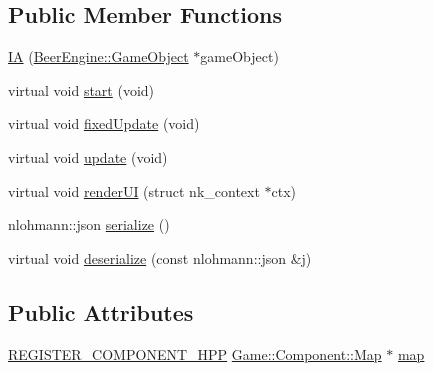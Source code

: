 \subsection*{Public Member Functions}
\begin{DoxyCompactItemize}
\item 
\mbox{\hyperlink{class_game_1_1_component_1_1_i_a_a0193b2ba07bc5bcabe9278a6dcd592bc}{IA}} (\mbox{\hyperlink{class_beer_engine_1_1_game_object}{Beer\+Engine\+::\+Game\+Object}} $\ast$game\+Object)
\item 
virtual void \mbox{\hyperlink{class_game_1_1_component_1_1_i_a_ab440dc76a8837e291f6545e0dd15c819}{start}} (void)
\item 
virtual void \mbox{\hyperlink{class_game_1_1_component_1_1_i_a_a72b1e3aaf4686e0abef2e147d48f50e9}{fixed\+Update}} (void)
\item 
virtual void \mbox{\hyperlink{class_game_1_1_component_1_1_i_a_a5890e0da2fb55d58868c0cd441c33dc4}{update}} (void)
\item 
virtual void \mbox{\hyperlink{class_game_1_1_component_1_1_i_a_a50991daa660054341c1f339611226c02}{render\+UI}} (struct nk\+\_\+context $\ast$ctx)
\item 
nlohmann\+::json \mbox{\hyperlink{class_game_1_1_component_1_1_i_a_a3d5af6c25e457a246fac8cbd63764223}{serialize}} ()
\item 
virtual void \mbox{\hyperlink{class_game_1_1_component_1_1_i_a_a81f34676232065d85961d84be1268e6f}{deserialize}} (const nlohmann\+::json \&j)
\end{DoxyCompactItemize}
\subsection*{Public Attributes}
\begin{DoxyCompactItemize}
\item 
\mbox{\hyperlink{_core_8hpp_a895cfc16b36b6c309f80b98ded63df4f}{R\+E\+G\+I\+S\+T\+E\+R\+\_\+\+C\+O\+M\+P\+O\+N\+E\+N\+T\+\_\+\+H\+PP}} \mbox{\hyperlink{class_game_1_1_component_1_1_map}{Game\+::\+Component\+::\+Map}} $\ast$ \mbox{\hyperlink{class_game_1_1_component_1_1_i_a_a2ae49ef7e89503294de091af505fce74}{map}}
\end{DoxyCompactItemize}
